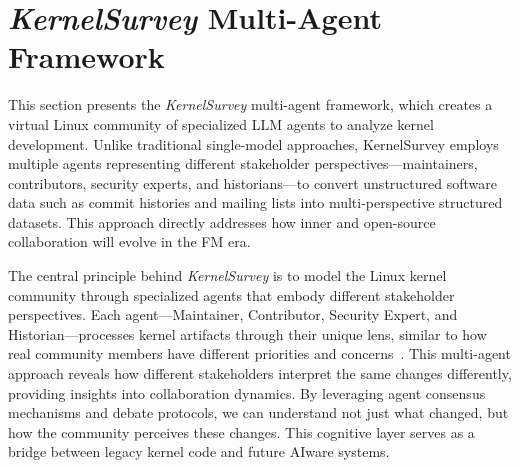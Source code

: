 \section{\emph{KernelSurvey} Multi-Agent Framework}
\label{sec:methodology}

This section presents the \emph{KernelSurvey} multi-agent framework, which creates a virtual Linux community of specialized LLM agents to analyze kernel development. Unlike traditional single-model approaches, KernelSurvey employs multiple agents representing different stakeholder perspectives—maintainers, contributors, security experts, and historians—to convert unstructured software data such as commit histories and mailing lists into multi-perspective structured datasets. This approach directly addresses how inner and open-source collaboration will evolve in the FM era.

The central principle behind \emph{KernelSurvey} is to model the Linux kernel community through specialized agents that embody different stakeholder perspectives. Each agent—Maintainer, Contributor, Security Expert, and Historian—processes kernel artifacts through their unique lens, similar to how real community members have different priorities and concerns~\cite{ji2023survey}. This multi-agent approach reveals how different stakeholders interpret the same changes differently, providing insights into collaboration dynamics. By leveraging agent consensus mechanisms and debate protocols, we can understand not just what changed, but how the community perceives these changes. This cognitive layer serves as a bridge between legacy kernel code and future AIware systems.

